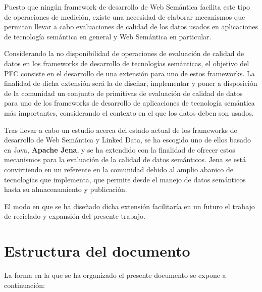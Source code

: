 Puesto que ningún framework de desarrollo de Web Semántica facilita este tipo de
operaciones de medición, existe una necesidad de elaborar
mecanismos que permitan llevar a cabo evaluaciones de calidad de los datos
usados en aplicaciones de tecnología semántica en general y Web Semántica en
particular.

Considerando la no disponibilidad de operaciones de evaluación de calidad de datos en los
frameworks de desarrollo de tecnologías semánticas, el objetivo del \acf{PFC}
consiste en el desarrollo de una
extensión para uno de estos frameworks. La finalidad de
dicha extensión será la de diseñar, implementar y poner a disposición de la
comunidad un conjunto de primitivas de evaluación de calidad de datos para uno de
los frameworks de desarrollo de aplicaciones de tecnología semántica más
importantes, considerando el contexto en el que los
datos deben son usados. 

Tras llevar a cabo un estudio acerca del estado actual de los frameworks de
desarrollo de Web Semántica y Linked Data, se ha escogido uno de ellos basado en
Java, \textbf{Apache Jena}, y se ha extendido con la finalidad de ofrecer estos
mecanismos para la evaluación de la calidad de datos semánticos. Jena se está
convirtiendo en un referente en la comunidad debido al amplio abanico
de tecnologías que implementa, que permite desde el manejo de datos semánticos
hasta su almacenamiento y publicación. 

El modo en que
se ha diseñado dicha extensión facilitaría en un futuro el trabajo de reciclado
y expansión del presente trabajo.



\section{Estructura del documento}

La forma en la que se ha organizado el presente documento se expone a
continuación: 


